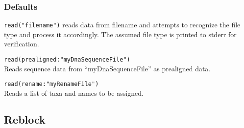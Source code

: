 	\subsubsection{Defaults}
		\texttt{read("filename")} reads data from filename and attempts to recognize the file type and 
		process it accordingly. The assumed file type is printed to stderr for verification.
		
	\begin{example}
		
		\item{\texttt{read(prealigned:"myDnaSequenceFile")}\\ Reads sequence data from 
		``myDnaSequenceFile'' as prealigned data.}
		
		\item{\texttt{read(rename:"myRenameFile")}\\ Reads a list of taxa and names to be assigned.} 
		
	\end{example}
		
%
\subsection{Reblock}
